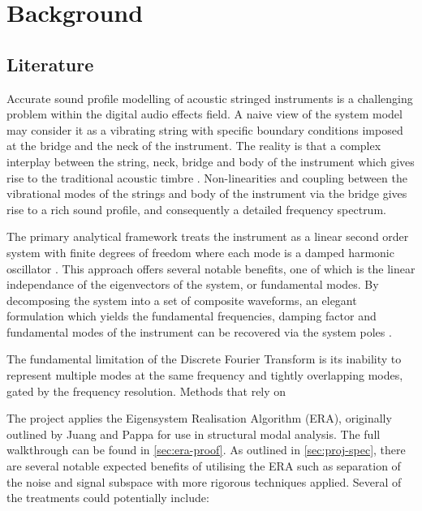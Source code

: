 \section{Background}
\subsection{Literature}
\label{sec:lit}

Accurate sound profile modelling of acoustic stringed instruments is a challenging problem within the digital audio effects field. A naive view of the system model may consider it as a vibrating string with specific boundary conditions imposed at the bridge and the neck of the instrument. The reality is that a complex interplay between the string, neck, bridge and body of the instrument which gives rise to the traditional acoustic timbre \cite{rossing-string-instruments}.
Non-linearities and coupling between the vibrational modes of the strings and body of the instrument via the bridge gives rise to a rich sound profile, and consequently a detailed frequency spectrum.

The primary analytical framework treats the instrument as a linear second order system with finite degrees of freedom where each mode is a damped harmonic oscillator \cite{modal-analysis-violin}. This approach offers several notable benefits, one of which is the linear independance of the eigenvectors of the system, or fundamental modes. By decomposing the system into a set of composite waveforms, an elegant formulation which yields the fundamental frequencies, damping factor and fundamental modes of the instrument can be recovered via the system poles \cite{juang-1994-book}.


The fundamental limitation of the Discrete Fourier Transform is its inability to represent multiple modes at the same frequency and tightly overlapping modes, gated by the frequency resolution. Methods that rely on 



The project applies the Eigensystem Realisation Algorithm (ERA), originally outlined by Juang and Pappa \cite{era,era-space} for use in structural modal analysis. The full walkthrough can be found in \ref{sec:era-proof}. As outlined in \ref{sec:proj-spec}, there are several notable expected benefits of utilising the ERA such as separation of the noise and signal subspace with more rigorous techniques applied. Several of the treatments could potentially include:

